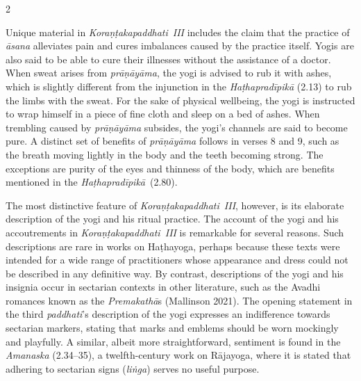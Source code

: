 \begin{nohyp}
\begin{multicols*}{2}
\begin{eng}
Unique material in \emph{Koraṇṭakapaddhati}~\emph{III} includes the claim that the practice of \emph{āsana} alleviates pain and cures imbalances caused by the practice itself. Yogis are also said to be able to cure their illnesses without the assistance of a doctor. When sweat arises from \emph{prāṇāyāma}, the yogi is advised to rub it with ashes, which is slightly different from the injunction in the \emph{Haṭhapradīpikā} (2.13) to rub the limbs with the sweat. For the sake of physical wellbeing, the yogi is instructed to wrap himself in a piece of fine cloth and sleep on a bed of ashes. When trembling caused by \emph{prāṇāyāma} subsides, the yogi's channels are said to become pure. A distinct set of benefits of \emph{prāṇāyāma} follows in verses 8 and 9, such as the breath moving lightly in the body and the teeth becoming strong. The exceptions are purity of the eyes and thinness of the body, which are benefits mentioned in the \emph{Haṭhapradīpikā}~(2.80).

The most distinctive feature of \emph{Koraṇṭakapaddhati}~\emph{III}, however, is its elaborate description of the yogi and his ritual practice. The account of the yogi and his accoutrements in \emph{Koraṇṭakapaddhati~III} is remarkable for several reasons. Such descriptions are rare in works on Haṭhayoga, perhaps because these texts were intended for a wide range of practitioners whose appearance and dress could not be described in any definitive way. By contrast, descriptions of the yogi and his insignia occur in sectarian contexts in other literature, such as the Avadhi romances known as the \emph{Premakathā}s (Mallinson 2021). The opening statement in the third \emph{paddhati}'s description of the yogi expresses an indifference towards sectarian markers, stating that marks and emblems should be worn mockingly and playfully. A similar, albeit more straightforward, sentiment is found in the \emph{Amanaska} (2.34--35), a twelfth-century work on Rājayoga, where it is stated that adhering to sectarian signs (\emph{liṅga}) serves no useful purpose.


\end{eng}
\end{multicols*}
\end{nohyp}
